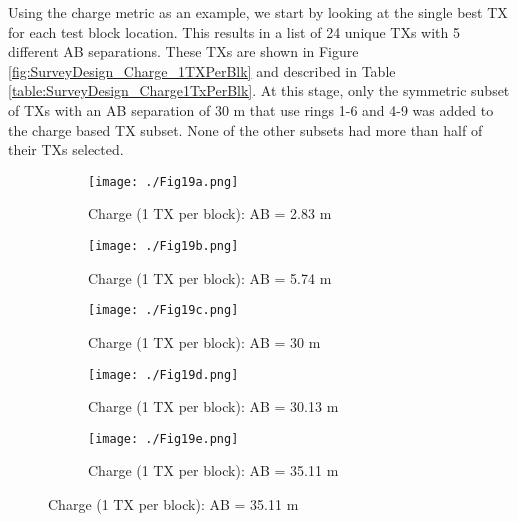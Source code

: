 \documentclass[preprint,authoryear,12pt]{elsarticle}
\begin{document}
Using the charge metric as an example, we start by looking at the single best TX for each test block location. This results in a list of 24 unique TXs with 5 different AB separations. These TXs are shown in Figure \ref{fig:SurveyDesign_Charge_1TXPerBlk} and described in Table \ref{table:SurveyDesign_Charge1TxPerBlk}. At this stage, only the symmetric subset of TXs with an AB separation of 30 m that use rings 1-6 and 4-9 was added to the charge based TX subset. None of the other subsets had more than half of their TXs selected.


\begin{figure} [htp]
   \begin{center}
      \begin{subfigure}{0.6\linewidth}
         \texttt{[image: ./Fig19a.png]}
         \caption{Charge (1 TX per block): AB = 2.83 m}
         \label{fig:SurveyDesign_Charge_1TxPerBlk_AB_2o83m}
      \end{subfigure}

      \begin{subfigure}{0.6\linewidth}
         \texttt{[image: ./Fig19b.png]}
         \caption{Charge (1 TX per block): AB = 5.74 m}
         \label{fig:SurveyDesign_Charge_1TxPerBlk_AB_5o74m}
      \end{subfigure}

      \begin{subfigure}{0.6\linewidth}
         \texttt{[image: ./Fig19c.png]}
         \caption{Charge (1 TX per block): AB = 30 m}
         \label{fig:SurveyDesign_Charge_1TxPerBlk_AB_30m}
      \end{subfigure}

      \begin{subfigure}{0.6\linewidth}
         \texttt{[image: ./Fig19d.png]}
         \caption{Charge (1 TX per block): AB = 30.13 m}
         \label{fig:SurveyDesign_Charge_1TxPerBlk_AB_30o13m}
      \end{subfigure}

      \begin{subfigure}{0.6\linewidth}
         \texttt{[image: ./Fig19e.png]}
         \caption{Charge (1 TX per block): AB = 35.11 m}
         \label{fig:SurveyDesign_Charge_1TxPerBlk_AB_35o11m}
      \end{subfigure}


\end{center}
\end{figure}
\end{document}
